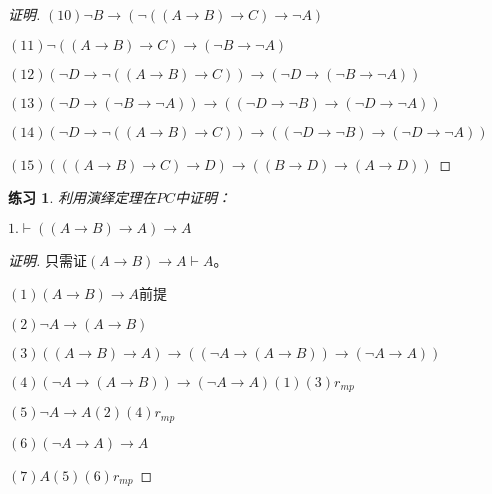 \documentclass{article}
\newtheorem{Exercise}{练习}
\begin{document}
\begin{CJK*}{UTF8}{gbsn}
\begin{proof}[证明]
  $(10)\lnot B\to (\lnot((A\to B)\to C)\to \lnot A)$

  $(11)\lnot((A\to B)\to C) \to (\lnot B\to \lnot A)$


  $(12)(\lnot D\to \lnot((A\to B)\to C)) \to(\lnot D\to  (\lnot B\to \lnot A))$

  $(13)(\lnot D\to  (\lnot B\to \lnot A))\to ((\lnot D\to \lnot B)\to (\lnot D\to \lnot A))$

  $(14)(\lnot D\to \lnot((A\to B)\to C)) \to ((\lnot D\to \lnot B)\to (\lnot D\to \lnot A))$

  $(15)(((A\to B)\to C)\to D)\to((B\to D)\to (A\to D))$
\end{proof}
\begin{Exercise}
  利用演绎定理在$PC$中证明：
\end{Exercise}

$1.\vdash ((A\to B)\to A)\to A$

\begin{proof}[证明]
  只需证$(A\to B)\to A\vdash A$。

  $(1)(A\to B)\to A$前提

  $(2)\lnot A\to (A\to B)$

  $(3)((A\to B)\to A)\to ((\lnot A\to (A\to B))\to (\lnot A\to A))$

  $(4)(\lnot A\to (A\to B))\to (\lnot A\to A)(1)(3)r_{mp}$

  $(5)\lnot A\to A(2)(4)r_{mp}$

  $(6)(\lnot A\to A)\to A$

  $(7)A (5)(6)r_{mp}$


\end{proof}
\end{CJK*}
\end{document}
